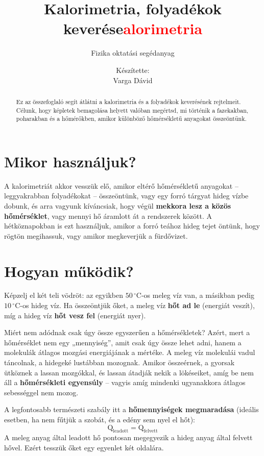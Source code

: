 \documentclass[11pt,a4paper]{article}
\title{Kalorimetria, folyadékok keverése}
\author{Fizika oktatási segédanyag}
\date{}
\providecommand{\textbfr}[1]{\textbf{\textcolor{red}{#1}}}
\begin{document}
\title{\textbfr{alorimetria}}
\author{Készítette:\\Varga Dávid}
\date{}
\maketitle

\begin{abstract}
Ez az összefoglaló segít átlátni a kalorimetria és a folyadékok keverésének rejtelmeit. Célunk, hogy képletek bemagolása helyett valóban megértsd, mi történik a fazekakban, poharakban és a hőmérőkben, amikor különböző hőmérsékletű anyagokat összeöntünk.
\end{abstract}

\section{Mikor használjuk?}
A kalorimetriát akkor vesszük elő, amikor eltérő hőmérsékletű anyagokat – leggyakrabban folyadékokat – összeöntünk, vagy egy forró tárgyat hideg vízbe dobunk, és arra vagyunk kíváncsiak, hogy végül \textbf{mekkora lesz a közös hőmérséklet}, vagy mennyi hő áramlott át a rendszerek között. A hétköznapokban is ezt használjuk, amikor a forró teához hideg tejet öntünk, hogy rögtön megihassuk, vagy amikor megkeverjük a fürdővizet.

\section{Hogyan működik?}
Képzelj el két teli vödröt: az egyikben $50\,^\circ\text{C}$-os meleg víz van, a másikban pedig $10\,^\circ\text{C}$-os hideg víz. Ha összeöntjük őket, a meleg víz \textbf{hőt ad le} (energiát veszít), míg a hideg víz \textbf{hőt vesz fel} (energiát nyer). 

Miért nem adódnak csak úgy össze egyszerűen a hőmérsékletek? Azért, mert a hőmérséklet nem egy „mennyiség”, amit csak úgy össze lehet adni, hanem a molekulák átlagos mozgási energiájának a mértéke. A meleg víz molekulái vadul táncolnak, a hidegeké lustábban mozognak. Amikor összeérnek, a gyorsak ütköznek a lassan mozgókkal, és lassan átadják nekik a lökéseiket, amíg be nem áll a \textbf{hőmérsékleti egyensúly} – vagyis amíg mindenki ugyanakkora átlagos sebességgel nem mozog.

A legfontosabb természeti szabály itt a \textbf{hőmennyiségek megmaradása} (ideális esetben, ha nem fűtjük a szobát, és a edény sem nyel el hőt):
$$\text{Q}_{\text{leadott}} = \text{Q}_{\text{felvett}}$$
A meleg anyag által leadott hő pontosan megegyezik a hideg anyag által felvett hővel. Ezért tesszük őket egy egyenlet két oldalára.
\end{document}
